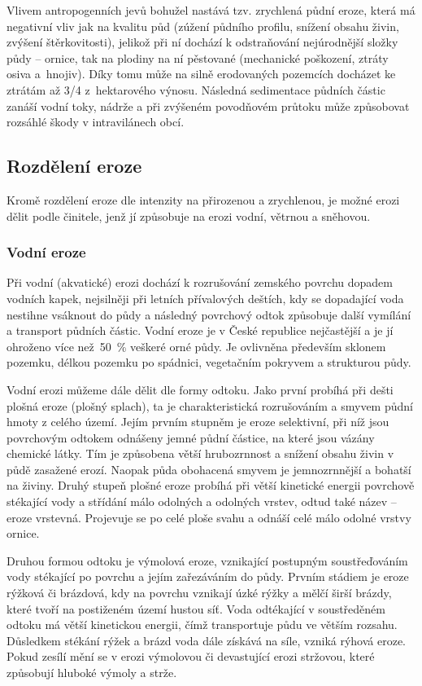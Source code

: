 Vlivem antropogenních jevů bohužel nastává tzv. zrychlená půdní eroze,
která má negativní vliv jak na kvalitu půd (zúžení půdního profilu,
snížení obsahu živin, zvýšení štěrkovitosti), jelikož při ní dochází k
odstraňování nejúrodnější složky půdy – ornice, tak na plodiny na ní
pěstované (mechanické poškození, ztráty osiva a~hnojiv). Díky tomu
může na silně erodovaných pozemcích docházet ke ztrátám až 3/4
z~hektarového výnosu. Následná sedimentace půdních částic zanáší vodní
toky, nádrže a při zvýšeném povodňovém průtoku může způsobovat
rozsáhlé škody v intravilánech obcí.\cite{Novotny2014}
\subsection{Rozdělení eroze}
Kromě rozdělení eroze dle intenzity na přirozenou a zrychlenou, je
možné erozi dělit podle činitele, jenž jí způsobuje na erozi vodní,
větrnou a sněhovou.\cite{Holy1994}
\subsubsection{Vodní eroze}
Při vodní (akvatické) erozi dochází k rozrušování zemského povrchu
dopadem vodních kapek, nejsilněji při letních přívalových deštích, kdy
se dopadající voda nestihne vsáknout do půdy a následný povrchový
odtok způsobuje další vymílání a transport půdních částic. Vodní eroze
je v České republice nejčastější a je jí ohroženo více než~50~\%
veškeré orné půdy. Je ovlivněna především sklonem pozemku, délkou
pozemku po spádnici, vegetačním pokryvem a strukturou půdy.

Vodní erozi můžeme dále dělit dle formy odtoku. Jako první probíhá při
dešti plošná eroze (plošný splach), ta je charakteristická
rozrušováním a smyvem půdní hmoty z celého území. Jejím prvním stupněm
je eroze selektivní, při níž jsou povrchovým odtokem odnášeny jemné
půdní částice, na které jsou vázány chemické látky. Tím je způsobena
větší hrubozrnnost a snížení obsahu živin v půdě zasažené
erozí. Naopak půda obohacená smyvem je jemnozrnnější a bohatší na
živiny. Druhý stupeň plošné eroze probíhá při větší kinetické energii
povrchově stékající vody a střídání málo odolných a odolných vrstev,
odtud také název – eroze vrstevná. Projevuje se po celé ploše svahu a
odnáší celé málo odolné vrstvy ornice.

Druhou formou odtoku je výmolová eroze, vznikající postupným
soustřeďováním vody stékající po povrchu a jejím zařezáváním do
půdy. Prvním stádiem je eroze rýžková či brázdová, kdy na povrchu
vznikají úzké rýžky a mělčí širší brázdy, které tvoří na postiženém
území hustou síť. Voda odtékající v soustředěném odtoku má větší
kinetickou energii, čímž transportuje půdu ve větším
rozsahu. Důsledkem stékání rýžek a brázd voda dále získává na síle,
vzniká rýhová eroze. Pokud zesílí mění se v erozi výmolovou či
devastující erozi stržovou, které způsobují hluboké výmoly a
strže.\cite{Novotny2014}
